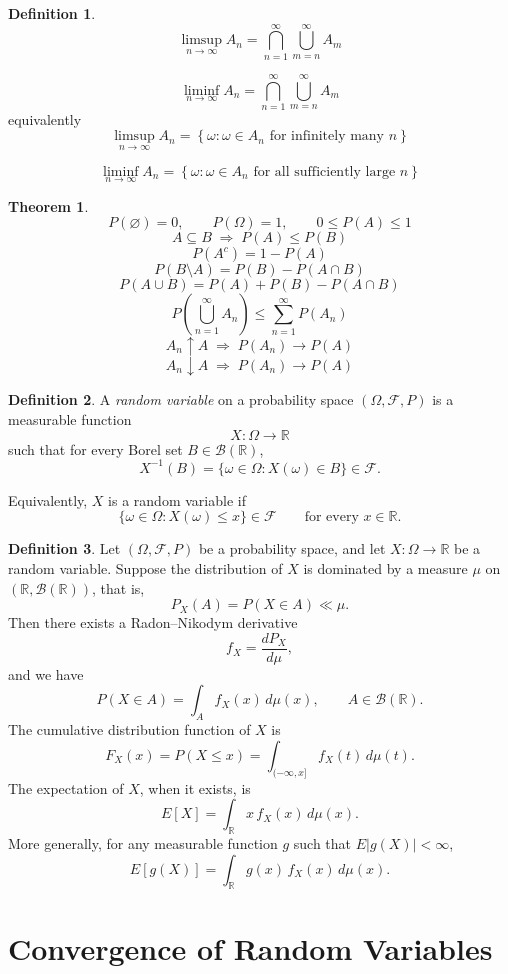 \documentclass[11pt]{article}
\theoremstyle{definition}
\newtheorem{defn}{Definition}[section]
\newtheorem{theo}{Theorem}[section]
\begin{document}
\begin{defn}
    \[
\limsup_{n\to\infty} A_n
=
\bigcap_{n=1}^\infty \bigcup_{m=n}^\infty A_m
\]

\[
\liminf_{n\to\infty} A_n
=
\bigcap_{n=1}^\infty \bigcup_{m=n}^\infty A_m
\]
equivalently
\[
\limsup_{n\to\infty} A_n
=
\left\{\omega:\omega\in A_n \text{ for infinitely many } n\right\}
\]

\[
\liminf_{n\to\infty} A_n
=
\left\{\omega:\omega\in A_n \text{ for all sufficiently large } n\right\}
\]
\end{defn}
\begin{theo}
\[
P(\varnothing)=0,\qquad P(\Omega)=1,\qquad 0\le P(A)\le 1
\]
\[
A\subseteq B \;\Longrightarrow\; P(A)\le P(B)
\]
\[
P(A^c)=1-P(A)
\]
\[
P(B\setminus A)=P(B)-P(A\cap B)
\]
\[
P(A\cup B)=P(A)+P(B)-P(A\cap B)
\]
\[
P\!\left(\bigcup_{n=1}^\infty A_n\right)\le \sum_{n=1}^\infty P(A_n)
\]
\[
A_n\uparrow A \;\Longrightarrow\; P(A_n)\to P(A)
\]
\[
A_n\downarrow A \;\Longrightarrow\; P(A_n)\to P(A)
\]
\end{theo}
\begin{defn}
    A \emph{random variable} on a probability space \((\Omega,\mathcal F,P)\) is a measurable function
\[
X:\Omega\to\mathbb R
\]
such that for every Borel set \(B\in\mathcal B(\mathbb R)\),
\[
X^{-1}(B)=\{\omega\in\Omega: X(\omega)\in B\}\in\mathcal F.
\]

Equivalently, \(X\) is a random variable if
\[
\{\omega\in\Omega: X(\omega)\le x\}\in\mathcal F
\qquad\text{for every }x\in\mathbb R.
\]
\end{defn}
\begin{defn}
    Let \((\Omega,\mathcal F,P)\) be a probability space, and let \(X:\Omega\to\mathbb R\) be a random variable.  
Suppose the distribution of \(X\) is dominated by a measure \(\mu\) on \((\mathbb R,\mathcal B(\mathbb R))\), that is,
\[
P_X(A)=P(X\in A)\ll \mu.
\]
Then there exists a Radon--Nikodym derivative
\[
f_X=\frac{dP_X}{d\mu},
\]
and we have
\[
P(X\in A)=\int_A f_X(x)\,d\mu(x), \qquad A\in\mathcal B(\mathbb R).
\]
The cumulative distribution function of \(X\) is
\[
F_X(x)=P(X\le x)=\int_{(-\infty,x]} f_X(t)\,d\mu(t).
\]
The expectation of \(X\), when it exists, is
\[
E[X]=\int_{\mathbb R} x\,f_X(x)\,d\mu(x).
\]
More generally, for any measurable function \(g\) such that \(E|g(X)|<\infty\),
\[
E[g(X)]=\int_{\mathbb R} g(x)\,f_X(x)\,d\mu(x).
\]
\end{defn}


\newpage
\section{Convergence of Random Variables}
\end{document}
